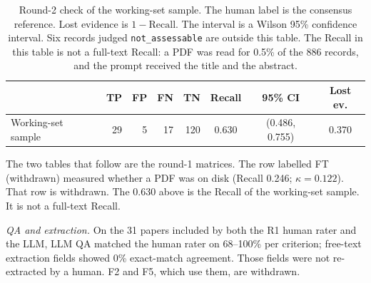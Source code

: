 \begin{table}[htbp]
\centering
\caption{Round-2 check of the working-set sample. The human label
is the consensus reference. Lost evidence is $1-\mathrm{Recall}$. The
interval is a Wilson 95\% confidence interval. Six records judged
\texttt{not\_assessable} are outside this table. The Recall in this
table is not a full-text Recall: a PDF was read for 0.5\% of the 886
records, and the prompt received the title and the abstract.}
\label{tab:r2-confusion}
\small
\begin{tabular}{lrrrrccc}
\toprule
 & TP & FP & FN & TN & Recall & 95\% CI & Lost ev. \\
\midrule
Working-set sample & 29 & 5 & 17 & 120 & 0.630 & (0.486, 0.755) & 0.370 \\
\bottomrule
\end{tabular}
\end{table}

The two tables that follow are the round-1 matrices. The row labelled
FT (withdrawn) measured whether a PDF was on disk (Recall 0.246;
$\kappa = 0.122$). That row is withdrawn. The 0.630 above is the Recall
of the working-set sample. It is not a full-text Recall.

\emph{QA and extraction.} On the 31 papers included by both the R1 human
rater and the LLM, LLM QA matched the human rater on 68--100\% per
criterion; free-text extraction fields showed 0\% exact-match agreement.
Those fields were not re-extracted by a human. F2 and F5, which use them,
are withdrawn.




